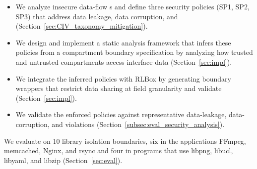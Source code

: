 \begin{itemize}
    \item We analyze insecure data-flow \vulName{}s and
    define three security policies (SP1, SP2, SP3) that address data
    leakage, data corruption, and 
    (Section~\ref{sec:CIV_taxonomy_mitigation}).

    \item We design and implement a static analysis framework that
    infers these policies from a compartment boundary specification by
    analyzing how trusted and untrusted compartments access interface data (Section~\ref{sec:impl}).

    \item We integrate the inferred policies with RLBox by generating
    boundary wrappers that restrict data sharing at field granularity and validate  (Section~\ref{sec:impl}).

    \item We validate the enforced policies against representative
    data-leakage, data-corruption, and  violations
    (Section~\ref{subsec:eval_security_analysis}).
\end{itemize}

We evaluate \sysName{} on 10 library isolation boundaries, six in the
applications FFmpeg, memcached, Nginx, and rsync and four in programs that use
libpng, libucl, libyaml, and libzip (Section~\ref{sec:eval}). 

